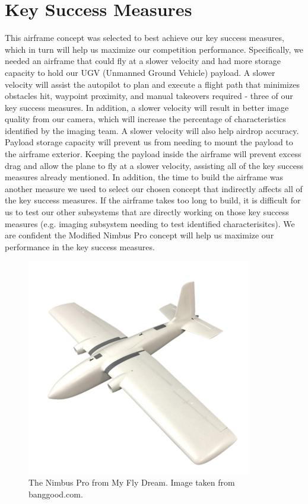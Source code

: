 \documentclass[]{auvsi_doc}
\begin{document}
\section{Key Success Measures}

This airframe concept was selected to best achieve our key success measures, which in turn will help us maximize our competition performance. Specifically, we needed an airframe that could fly at a slower velocity and had more storage capacity to hold our UGV (Unmanned Ground Vehicle) payload. A slower velocity will assist the autopilot to plan and execute a flight path that minimizes obstacles hit, waypoint proximity, and manual takeovers required - three of our key success measures. In addition, a slower velocity will result in better image quality from our camera, which will increase the percentage of characteristics identified by the imaging team. A slower velocity will also help airdrop accuracy. 
Payload storage capacity will prevent us from needing to mount the payload to the airframe exterior. Keeping the payload inside the airframe will prevent excess drag and allow the plane to fly at a slower velocity, assisting all of the key success measures already mentioned. In addition, the time to build the airframe was another measure we used to select our chosen concept that indirectly affects all of the key success measures. If the airframe takes too long to build, it is difficult for us to test our other subsystems that are directly working on those key success measures (e.g. imaging subsystem needing to test identified characterisitcs). We are confident the Modified Nimbus Pro concept will help us maximize our performance in the key success measures.

\begin{figure}[h!]
	\centering
	\includegraphics[scale=0.7]{figs/NimbusPro}
	\caption{The Nimbus Pro from My Fly Dream. Image taken from banggood.com.}
	\label{fig:nimbus}    
\end{figure}
\end{document}
